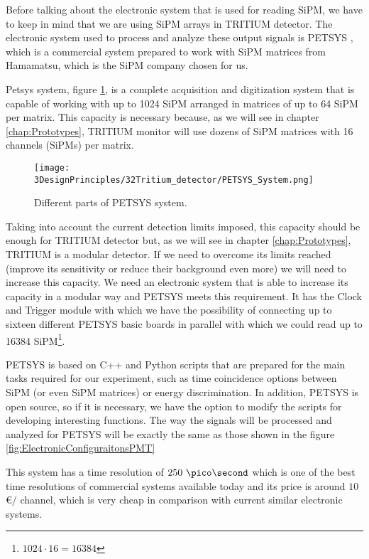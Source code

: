 Before talking about the electronic system that is used for reading SiPM, we have to keep in mind that we are using SiPM arrays in TRITIUM detector. The electronic system used to process and analyze these output signals is PETSYS \cite{PETSYS}, which is a commercial system prepared to work with SiPM matrices from Hamamatsu, which is the SiPM company chosen for us.

Petsys system, figure \ref{fig:PETSYS}, is a complete acquisition and digitization system that is capable of working with up to 1024 SiPM arranged in matrices of up to 64 SiPM per matrix. This capacity is necessary because, as we will see in chapter \ref{chap:Prototypes}, TRITIUM monitor will use dozens of SiPM matrices with 16 channels (SiPMs) per matrix.

\begin{figure}[htbp]
\centering
\texttt{[image: 3DesignPrinciples/32Tritium\_detector/PETSYS\_System.png]}
\caption{Different parts of PETSYS system.\label{fig:PETSYS}~\cite{PETSYS}}
\end{figure}

Taking into account the current detection limits imposed, this capacity should be enough for TRITIUM detector but, as we will see in chapter \ref{chap:Prototypes}, TRITIUM is a modular detector. If we need to overcome its limits reached (improve its sensitivity or reduce their background even more) we will need to increase this capacity. We need an electronic system that is able to increase its capacity in a modular way and PETSYS meets this requirement. It has the Clock and Trigger module with which we have the possibility of connecting up to sixteen different PETSYS basic boards in parallel with which we could read up to 16384 SiPM\footnote{$1024\cdot{}16 = 16384$}.

PETSYS is based on C++ and Python scripts that are prepared for the main tasks required for our experiment, such as time coincidence options between SiPM (or even SiPM matrices) or energy discrimination. In addition, PETSYS is open source, so if it is necessary, we have the option to modify the scripts for developing interesting functions. The way the signals will be processed and analyzed for PETSYS will be exactly the same as those shown in the figure \ref{fig:ElectronicConfiguraitonsPMT}

This system has a time resolution of $250~\pico\second$ which is one of the best time resolutions of commercial systems available today and its price is around $10$\euro$/$ channel, which is very cheap in comparison with current similar electronic systems.

